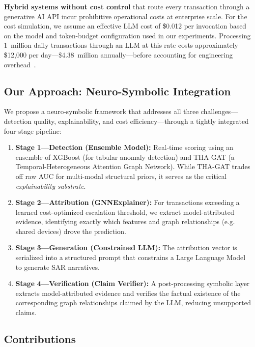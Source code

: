 \documentclass[journal]{IEEEtran}
\begin{document}
\textbf{Hybrid systems without cost control} that route every transaction through a generative AI API incur prohibitive operational costs at enterprise scale. For the cost simulation, we assume an effective LLM cost of \$0.012 per invocation based on the model and token-budget configuration used in our experiments. Processing 1~million daily transactions through an LLM at this rate costs approximately \$12,000 per day---\$4.38~million annually---before accounting for engineering overhead~\cite{google_pricing}.

\subsection{Our Approach: Neuro-Symbolic Integration}

We propose a neuro-symbolic framework that addresses all three challenges---detection quality, explainability, and cost efficiency---through a tightly integrated four-stage pipeline:

\begin{enumerate}
    \item \textbf{Stage 1---Detection (Ensemble Model):} Real-time scoring using an ensemble of XGBoost (for tabular anomaly detection) and THA-GAT (a Temporal-Heterogeneous Attention Graph Network). While THA-GAT trades off raw AUC for multi-modal structural priors, it serves as the critical \emph{explainability substrate}.
    \item \textbf{Stage 2---Attribution (GNNExplainer):} For transactions exceeding a learned cost-optimized escalation threshold, we extract model-attributed evidence, identifying exactly which features and graph relationships (e.g. shared devices) drove the prediction.
    \item \textbf{Stage 3---Generation (Constrained LLM):} The attribution vector is serialized into a structured prompt that constrains a Large Language Model to generate SAR narratives.
    \item \textbf{Stage 4---Verification (Claim Verifier):} A post-processing symbolic layer extracts model-attributed evidence and verifies the factual existence of the corresponding graph relationships claimed by the LLM, reducing unsupported claims.
\end{enumerate}

\subsection{Contributions}
\end{document}
